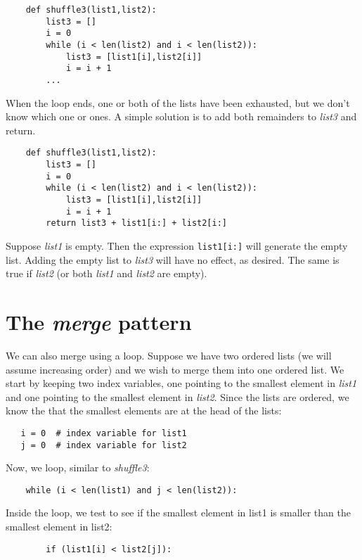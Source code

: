 \begin{verbatim}
    def shuffle3(list1,list2):
        list3 = []
        i = 0
        while (i < len(list2) and i < len(list2)):
            list3 = [list1[i],list2[i]]
            i = i + 1
        ...
\end{verbatim}

When the loop ends, one or both of the lists have been exhausted,
but we don't know which one or ones. A simple solution is to
add both remainders to {\it list3} and return.

\begin{verbatim}
    def shuffle3(list1,list2):
        list3 = []
        i = 0
        while (i < len(list2) and i < len(list2)):
            list3 = [list1[i],list2[i]]
            i = i + 1
        return list3 + list1[i:] + list2[i:]
\end{verbatim}

Suppose {\it list1} is empty. Then the expression {\tt list1[i:]} will
generate the empty list. Adding the empty list to {\it list3} will
have no effect, as desired. The same is true if {\it list2}
(or both {\it list1} and {\it list2} are empty).

\section{The {\it merge} pattern}

We can also merge using a loop. Suppose we have two
ordered lists (we will assume increasing order)
and we wish to merge them into one ordered
list. We start by keeping two index variables,
one pointing to the smallest element in {\it list1} and
one pointing to the smallest element in {\it list2}.
Since the lists are ordered, we know the that the smallest
elements are at the head of the lists:

\begin{verbatim}
   i = 0  # index variable for list1
   j = 0  # index variable for list2
\end{verbatim}

Now, we loop, similar to {\it shuffle3}:

\begin{verbatim}
    while (i < len(list1) and j < len(list2)):
\end{verbatim}

Inside the loop, we test to see if the smallest element
in list1 is smaller than the smallest element in list2:

\begin{verbatim}
        if (list1[i] < list2[j]):
\end{verbatim}


